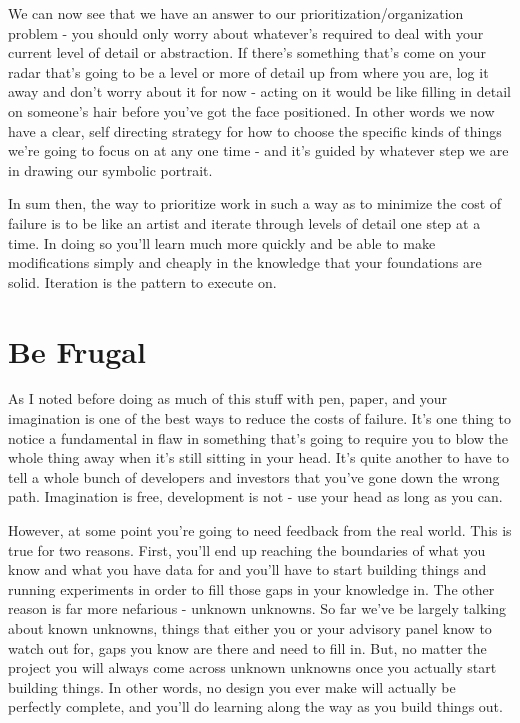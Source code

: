 \documentclass[11pt,a5paper]{book}
\begin{document}
We can now see that we have an answer to our prioritization/organization problem - you should only worry about whatever's required to deal with your current level of detail or abstraction. If there's something that's come on your radar that's going to be a level or more of detail up from where you are, log it away and don't worry about it for now - acting on it would be like filling in detail on someone's hair before you've got the face positioned. In other words we now have a clear, self directing strategy for how to choose the specific kinds of things we're going to focus on at any one time - and it's guided by whatever step we are in drawing our symbolic portrait. 
\newline

In sum then, the way to prioritize work in such a way as to minimize the cost of failure is to be like an artist and iterate through levels of detail one step at a time. In doing so you'll learn much more quickly and be able to make modifications simply and cheaply in the knowledge that your foundations are solid. Iteration is the pattern to execute on.

\section{Be Frugal}
As I noted before doing as much of this stuff with pen, paper, and your imagination is one of the best ways to reduce the costs of failure. It's one thing to notice a fundamental in flaw in something that's going to require you to blow the whole thing away when it's still sitting in your head. It's quite another to have to tell a whole bunch of developers and investors that you've gone down the wrong path. Imagination is free, development is not - use your head as long as you can.
\newline

However, at some point you're going to need feedback from the real world. This is true for two reasons. First, you'll end up reaching the boundaries of what you know and what you have data for and you'll have to start building things and running experiments in order to fill those gaps in your knowledge in. The other reason is far more nefarious - unknown unknowns. So far we've be largely talking about known unknowns, things that either you or your advisory panel know to watch out for, gaps you know are there and need to fill in. But, no matter the project you will always come across unknown unknowns once you actually start building things. In other words, no design you ever make will actually be perfectly complete, and you'll do learning along the way as you build things out. 
\newline
\end{document}
